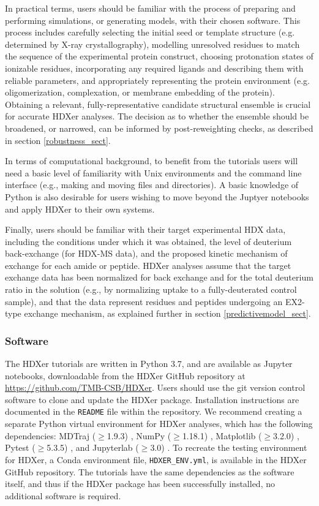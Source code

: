 \documentclass[9pt,tutorial]{livecoms}
\begin{document}
In practical terms, users should be familiar with the process of preparing and performing simulations, or generating models, with their chosen software. 
This process includes carefully selecting the initial seed or template structure (e.g. determined by X-ray crystallography), modelling unresolved residues to match the sequence of the experimental protein construct, choosing protonation states of ionizable residues, incorporating any required ligands and describing them with reliable parameters, and appropriately representing the protein environment (e.g. oligomerization, complexation, or membrane embedding of the protein).
Obtaining a relevant, fully-representative candidate structural ensemble is crucial for accurate HDXer analyses.
The decision as to whether the ensemble should be broadened, or narrowed, can be informed by post-reweighting checks, as described in section \ref{robustness_sect}.

In terms of computational background, to benefit from the tutorials users will need a basic level of familiarity with Unix environments and the command line interface (e.g., making and moving files and directories).
A basic knowledge of Python is also desirable for users wishing to move beyond the Juptyer notebooks and apply HDXer to their own systems. 

Finally, users should be familiar with their target experimental HDX data, including the conditions under which it was obtained, the level of deuterium back-exchange (for HDX-MS data), and the proposed kinetic mechanism of exchange for each amide or peptide.
HDXer analyses assume that the target exchange data has been normalized for back exchange and for the total deuterium ratio in the solution (e.g., by normalizing uptake to a fully-deuterated control sample), and that the data represent residues and peptides undergoing an EX2-type exchange mechanism, as explained further in section \ref{predictivemodel_sect}.

\subsubsection{Software}\label{Software_sect}
The HDXer tutorials are written in Python 3.7, and are available as Jupyter notebooks, downloadable from the HDXer GitHub repository at \url{https://github.com/TMB-CSB/HDXer}.
Users should use the git version control software to clone and update the HDXer package. Installation instructions are documented in the \texttt{README} file within the repository.
We recommend creating a separate Python virtual environment for HDXer analyses, which has the following dependencies: MDTraj ($\geqslant$1.9.3) \cite{McGibbon2015MDTraj}, NumPy ($\geqslant$1.18.1) \cite{Harris2020}, Matplotlib ($\geqslant$3.2.0) \cite{Hunter:2007}, Pytest ($\geqslant$5.3.5) \cite{pytest5.3}, and Jupyterlab ($\geqslant$3.0) \cite{project_jupyter}.
To recreate the testing environment for HDXer, a Conda environment file, \texttt{HDXER\_ENV.yml}, is available in the HDXer GitHub repository.
The tutorials have the same dependencies as the software itself, and thus if the HDXer package has been successfully installed, no additional software is required.
\end{document}
